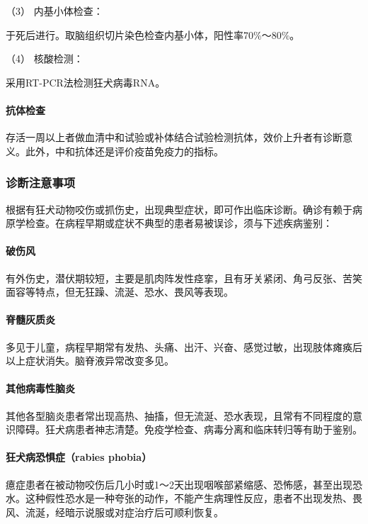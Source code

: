 \hypertarget{text00221.htmlux5cux23CHP7-6-2-3-3-3}{}
（3） 内基小体检查：

于死后进行。取脑组织切片染色检查内基小体，阳性率70\%～80\%。

\hypertarget{text00221.htmlux5cux23CHP7-6-2-3-3-4}{}
（4） 核酸检测：

采用RT-PCR法检测狂犬病毒RNA。

\paragraph{抗体检查}

存活一周以上者做血清中和试验或补体结合试验检测抗体，效价上升者有诊断意义。此外，中和抗体还是评价疫苗免疫力的指标。

\subsubsection{诊断注意事项}

根据有狂犬动物咬伤或抓伤史，出现典型症状，即可作出临床诊断。确诊有赖于病原学检查。在病程早期或症状不典型的患者易被误诊，须与下述疾病鉴别：

\paragraph{破伤风}

有外伤史，潜伏期较短，主要是肌肉阵发性痉挛，且有牙关紧闭、角弓反张、苦笑面容等特点，但无狂躁、流涎、恐水、畏风等表现。

\paragraph{脊髓灰质炎}

多见于儿童，病程早期常有发热、头痛、出汗、兴奋、感觉过敏，出现肢体瘫痪后以上症状消失。脑脊液异常改变多见。

\paragraph{其他病毒性脑炎}

其他各型脑炎患者常出现高热、抽搐，但无流涎、恐水表现，且常有不同程度的意识障碍。狂犬病患者神志清楚。免疫学检查、病毒分离和临床转归等有助于鉴别。

\paragraph{狂犬病恐惧症（rabies phobia）}

癔症患者在被动物咬伤后几小时或1～2天出现咽喉部紧缩感、恐怖感，甚至出现恐水。这种假性恐水是一种夸张的动作，不能产生病理性反应，患者不出现发热、畏风、流涎，经暗示说服或对症治疗后可顺利恢复。

